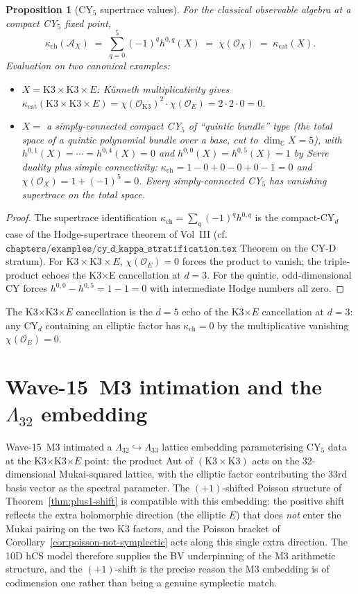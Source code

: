 \documentclass[11pt]{amsart}
\providecommand{\C}{\mathbb{C}}
\providecommand{\cA}{\mathcal{A}}
\providecommand{\cO}{\mathcal{O}}
\providecommand{\kappach}{\kappa_{\mathrm{ch}}}
\providecommand{\kappacat}{\kappa_{\mathrm{cat}}}
\theoremstyle{plain}
\newtheorem{proposition}[theorem]{Proposition}
\theoremstyle{definition}
\begin{document}
\begin{proposition}[CY$_5$ supertrace values]
\label{prop:kappa-ch-CY5}
For the classical observable algebra at a compact CY$_5$ fixed point,
\[
\kappach(\cA_X) \;=\; \sum_{q=0}^{5} (-1)^q h^{0,q}(X)
\;=\; \chi(\cO_X) \;=\; \kappacat(X).
\]
Evaluation on two canonical examples:
\begin{itemize}
\item $X = \mathrm{K3} \times \mathrm{K3} \times E$: Künneth
multiplicativity gives $\kappacat(\mathrm{K3} \times \mathrm{K3}
\times E) = \chi(\cO_{\mathrm{K3}})^2 \cdot \chi(\cO_E) = 2 \cdot 2
\cdot 0 = 0$.
\item $X = $ a simply-connected compact CY$_5$ of ``quintic bundle''
type (the total space of a quintic polynomial bundle over a base,
cut to $\dim_\C X = 5$), with $h^{0,1}(X) = \cdots = h^{0,4}(X) = 0$
and $h^{0,0}(X) = h^{0,5}(X) = 1$ by Serre duality plus simple
connectivity: $\kappach = 1 - 0 + 0 - 0 + 0 - 1 = 0$ and $\chi(\cO_X)
= 1 + (-1)^5 = 0$. Every simply-connected CY$_5$ has vanishing
supertrace on the total space.
\end{itemize}
\end{proposition}

\begin{proof}
The supertrace identification $\kappach = \sum_q (-1)^q h^{0,q}$ is
the compact-CY$_d$ case of the Hodge-supertrace theorem of Vol~III
(cf.\ $\texttt{chapters/examples/cy\_d\_kappa\_stratification.tex}$
Theorem on the CY-D stratum). For $\mathrm{K3} \times \mathrm{K3}
\times E$, $\chi(\cO_E) = 0$ forces the product to vanish; the
triple-product echoes the K3$\times$E cancellation at $d=3$. For
the quintic, odd-dimensional CY forces $h^{0,0} - h^{0,5} = 1 - 1 = 0$
with intermediate Hodge numbers all zero.
\end{proof}

The K3$\times$K3$\times E$ cancellation is the $d=5$ echo of the
K3$\times E$ cancellation at $d=3$: any CY$_d$ containing an elliptic
factor has $\kappach = 0$ by the multiplicative vanishing
$\chi(\cO_E) = 0$.

\section{Wave-15~M3 intimation and the $\Lambda_{32}$ embedding}

Wave-15~M3 \cite{WaveM3} intimated a $\Lambda_{32} \hookrightarrow
\Lambda_{33}$ lattice embedding parameterising CY$_5$ data at the
K3$\times$K3$\times E$ point: the product
Aut of $(\mathrm{K3} \times \mathrm{K3})$ acts on the 32-dimensional
Mukai-squared lattice, with the elliptic factor contributing the
33rd basis vector as the spectral parameter. The $(+1)$-shifted
Poisson structure of Theorem~\ref{thm:plus1-shift} is compatible with
this embedding: the positive shift reflects the extra holomorphic
direction (the elliptic $E$) that does \emph{not} enter the
Mukai pairing on the two K3 factors, and the Poisson bracket of
Corollary~\ref{cor:poisson-not-symplectic} acts along this single
extra direction. The 10D hCS model therefore supplies the BV
underpinning of the M3 arithmetic structure, and the $(+1)$-shift
is the precise reason the M3 embedding is of codimension one rather
than being a genuine symplectic match.
\end{document}
